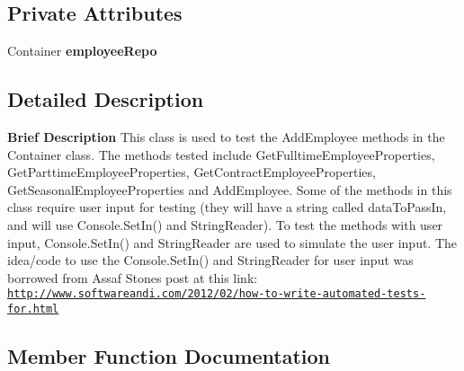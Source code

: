 \subsection*{Private Attributes}
\begin{DoxyCompactItemize}
\item 
\hypertarget{class_the_company_1_1_tests_1_1_add_employee_tests_af3ae11de7dbfe8a320fa9820ef398847}{}Container {\bfseries employee\+Repo}\label{class_the_company_1_1_tests_1_1_add_employee_tests_af3ae11de7dbfe8a320fa9820ef398847}

\end{DoxyCompactItemize}


\subsection{Detailed Description}
{\bfseries  Brief Description} This class is used to test the Add\+Employee methods in the Container class. The methods tested include Get\+Fulltime\+Employee\+Properties, Get\+Parttime\+Employee\+Properties, Get\+Contract\+Employee\+Properties, Get\+Seasonal\+Employee\+Properties and Add\+Employee. Some of the methods in this class require user input for testing (they will have a string called data\+To\+Pass\+In, and will use Console.\+Set\+In() and String\+Reader). To test the methods with user input, Console.\+Set\+In() and String\+Reader are used to simulate the user input. The idea/code to use the Console.\+Set\+In() and String\+Reader for user input was borrowed from Assaf Stone\textquotesingle{}s post at this link\+: \href{http://www.softwareandi.com/2012/02/how-to-write-automated-tests-for.html}{\tt http\+://www.\+softwareandi.\+com/2012/02/how-\/to-\/write-\/automated-\/tests-\/for.\+html} 

\subsection{Member Function Documentation}
\hypertarget{class_the_company_1_1_tests_1_1_add_employee_tests_a5df4ad5271ea9e8b1d34111800128944}{}
